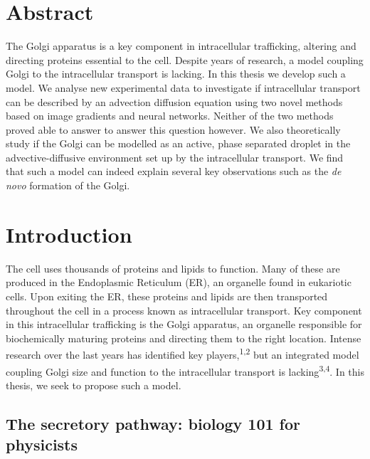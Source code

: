\documentclass{Dissertate}
\begin{document}
\hypertarget{abstract}{%
\chapter*{Abstract}\label{abstract}}
 The Golgi apparatus is a key component in intracellular
trafficking, altering and directing proteins essential to the cell.
Despite years of research, a model coupling Golgi to the intracellular transport is lacking. In this thesis we develop such a model. We analyse new experimental data to investigate if intracellular transport can be described by an advection diffusion equation using two novel methods based on image gradients and neural networks. Neither of the two methods proved able to answer to answer this question however. We also theoretically study if the Golgi can be modelled as an active, phase separated droplet in the advective-diffusive environment set up by the intracellular transport. We find that such a model can indeed explain several key observations such as the \emph{de novo} formation of the Golgi.




\newpage


\tableofcontents

\newpage

\setcounter{page}{1}
\hypertarget{introduction}{%
\chapter{Introduction}\label{introduction}}

The cell uses thousands of proteins and lipids to function. Many of
these are produced in the Endoplasmic Reticulum (ER), an organelle found
in eukariotic cells. Upon exiting the ER, these proteins and lipids are
then transported throughout the cell in a process known as intracellular
transport. Key component in this intracellular trafficking is the Golgi
apparatus, an organelle responsible for biochemically maturing proteins
and directing them to the right location. Intense research over the last
years has identified key players,\textsuperscript{1,2}
but an integrated model coupling Golgi size and function to the
intracellular transport is
lacking\textsuperscript{3,4}. In this thesis, we seek
to propose such a model.

\hypertarget{the-secretory-pathway-biology-101-for-physicists}{%
\section{The secretory pathway: biology 101 for
physicists}\label{the-secretory-pathway-biology-101-for-physicists}}
\end{document}
